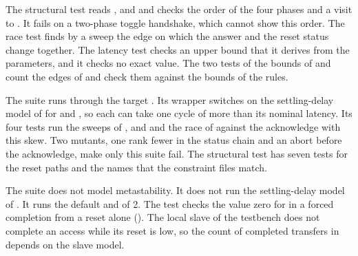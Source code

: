 The structural test reads ,  and  and checks the order of the four phases and a visit to . It fails on a two-phase toggle handshake, which cannot show this order. The race test finds by a sweep the edge on which the answer and the reset status change together. The latency test  checks an upper bound that it derives from the parameters, and it checks no exact value. The two tests of the bounds of  and  count the edges of  and check them against the bounds of the rules.

The suite  runs through the target . Its wrapper  switches on the settling-delay model of  for  and , so each can take one cycle of  more than its nominal latency. Its four tests run the sweeps of ,  and  and the race of  against the acknowledge with this skew. Two mutants, one rank fewer in the status chain and an abort before the acknowledge, make only this suite fail. The structural test  has seven tests for the reset paths and the names that the constraint files match.

The suite  does not model metastability. It does not run the settling-delay model of . It runs the default  and  of 2. The test  checks the value zero for  in a forced completion from a reset alone (). The local slave of the testbench does not complete an access while its reset is low, so the count of completed transfers in  depends on the slave model.

